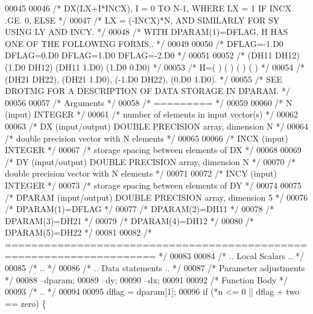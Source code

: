 \begin{DoxyCode}
00045 
00046 \textcolor{comment}{/*     DX(LX+I*INCX), I = 0 TO N-1, WHERE LX = 1 IF INCX .GE. 0, ELSE */}
00047 \textcolor{comment}{/*     LX = (-INCX)*N, AND SIMILARLY FOR SY USING LY AND INCY. */}
00048 \textcolor{comment}{/*     WITH DPARAM(1)=DFLAG, H HAS ONE OF THE FOLLOWING FORMS.. */}
00049 
00050 \textcolor{comment}{/*     DFLAG=-1.D0     DFLAG=0.D0        DFLAG=1.D0     DFLAG=-2.D0 */}
00051 
00052 \textcolor{comment}{/*       (DH11  DH12)    (1.D0  DH12)    (DH11  1.D0)    (1.D0  0.D0) */}
00053 \textcolor{comment}{/*     H=(          )    (          )    (          )    (          ) */}
00054 \textcolor{comment}{/*       (DH21  DH22),   (DH21  1.D0),   (-1.D0 DH22),   (0.D0  1.D0). */}
00055 \textcolor{comment}{/*     SEE DROTMG FOR A DESCRIPTION OF DATA STORAGE IN DPARAM. */}
00056 
00057 \textcolor{comment}{/*  Arguments */}
00058 \textcolor{comment}{/*  ========= */}
00059 
00060 \textcolor{comment}{/*  N      (input) INTEGER */}
00061 \textcolor{comment}{/*         number of elements in input vector(s) */}
00062 
00063 \textcolor{comment}{/*  DX     (input/output) DOUBLE PRECISION array, dimension N */}
00064 \textcolor{comment}{/*         double precision vector with N elements */}
00065 
00066 \textcolor{comment}{/*  INCX   (input) INTEGER */}
00067 \textcolor{comment}{/*         storage spacing between elements of DX */}
00068 
00069 \textcolor{comment}{/*  DY     (input/output) DOUBLE PRECISION array, dimension N */}
00070 \textcolor{comment}{/*         double precision vector with N elements */}
00071 
00072 \textcolor{comment}{/*  INCY   (input) INTEGER */}
00073 \textcolor{comment}{/*         storage spacing between elements of DY */}
00074 
00075 \textcolor{comment}{/*  DPARAM (input/output)  DOUBLE PRECISION array, dimension 5 */}
00076 \textcolor{comment}{/*     DPARAM(1)=DFLAG */}
00077 \textcolor{comment}{/*     DPARAM(2)=DH11 */}
00078 \textcolor{comment}{/*     DPARAM(3)=DH21 */}
00079 \textcolor{comment}{/*     DPARAM(4)=DH12 */}
00080 \textcolor{comment}{/*     DPARAM(5)=DH22 */}
00081 
00082 \textcolor{comment}{/*  ===================================================================== */}
00083 
00084 \textcolor{comment}{/*     .. Local Scalars .. */}
00085 \textcolor{comment}{/*     .. */}
00086 \textcolor{comment}{/*     .. Data statements .. */}
00087     \textcolor{comment}{/* Parameter adjustments */}
00088     --dparam;
00089     --dy;
00090     --dx;
00091 
00092     \textcolor{comment}{/* Function Body */}
00093 \textcolor{comment}{/*     .. */}
00094 
00095     dflag = dparam[1];
00096     \textcolor{keywordflow}{if} (*n <= 0 || dflag + two == zero) \{

\end{DoxyCode}
